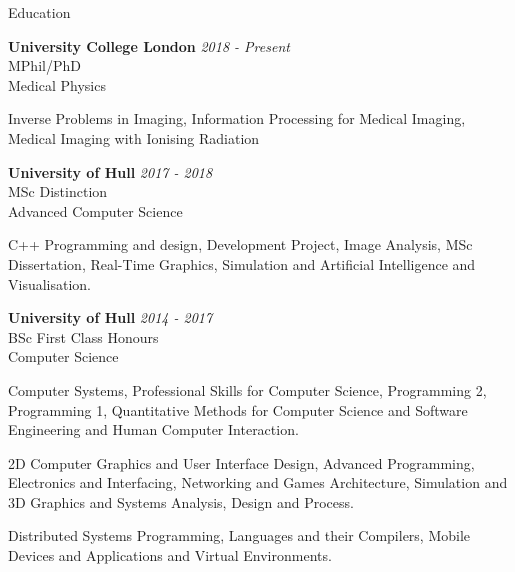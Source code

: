 \documentclass{cv}
\begin{document}
\begin{rSection}{Education}

{\bf University College London} \hfill {\em 2018 - Present} 
\\ MPhil/PhD
\\ Medical Physics

\item Inverse Problems in Imaging, Information Processing for Medical Imaging, Medical Imaging with Ionising Radiation

{\bf University of Hull} \hfill {\em 2017 - 2018} 
\\ MSc \hfill {Distinction}
\\ Advanced Computer Science

\item C++ Programming and design, Development Project, Image Analysis, MSc Dissertation, Real-Time Graphics, Simulation and Artificial Intelligence and Visualisation.

{\bf University of Hull} \hfill {\em 2014 - 2017} 
\\ BSc \hfill {First Class Honours}
\\ Computer Science

\item Computer Systems, Professional Skills for Computer Science, Programming 2, Programming 1, Quantitative Methods for Computer Science and Software Engineering and Human Computer Interaction.

\item 2D Computer Graphics and User Interface Design, Advanced Programming, Electronics and Interfacing, Networking and Games Architecture, Simulation and 3D Graphics and Systems Analysis, Design and Process.

\item Distributed Systems Programming, Languages and their Compilers, Mobile Devices and Applications and Virtual Environments.

\end{rSection}

\end{document}

